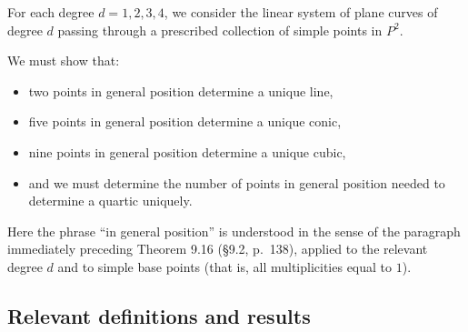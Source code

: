 \documentclass[a4paper,12pt,openany]{article}
\theoremstyle{plain}
\theoremstyle{definition}
\theoremstyle{remark}
\begin{document}
For each degree $d=1,2,3,4$, we consider the linear system of plane curves
of degree $d$ passing through a prescribed collection of simple points in
$P^2$.

We must show that:

\begin{itemize}
    \item two points in general position determine a unique line,
    \item five points in general position determine a unique conic,
    \item nine points in general position determine a unique cubic,
    \item and we must determine the number of points in general position
    needed to determine a quartic uniquely.
\end{itemize}

Here the phrase ``in general position'' is understood in the sense of the
paragraph immediately preceding Theorem 9.16 (\S9.2, p.~138), applied to
the relevant degree $d$ and to simple base points (that is, all multiplicities
equal to $1$).

\subsection*{Relevant definitions and results}
\end{document}
